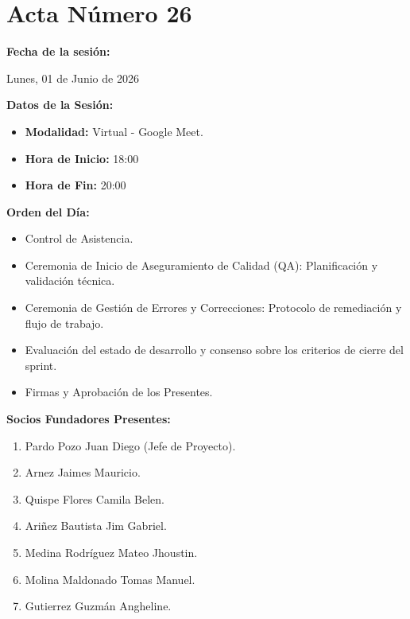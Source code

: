 \newpage
\section{Acta Número 26}
\label{sec:acta26}

\noindent \textbf{Fecha de la sesión:}\par
Lunes, 01 de Junio de 2026

\vspace*{0.5cm}
\noindent \textbf{Datos de la Sesión:}
\vspace{-0.2cm}
\begin{itemize}[noitemsep]
    \item \textbf{Modalidad:} Virtual - Google Meet.
    \item \textbf{Hora de Inicio:} 18:00
    \item \textbf{Hora de Fin:} 20:00
\end{itemize}

\vspace*{0.5cm}
\noindent \textbf{Orden del Día:}
\vspace{-0.2cm}
\begin{itemize}[noitemsep]
    \item Control de Asistencia.
    \item Ceremonia de Inicio de Aseguramiento de Calidad (QA): Planificación y validación técnica.
    \item Ceremonia de Gestión de Errores y Correcciones: Protocolo de remediación y flujo de trabajo.
    \item Evaluación del estado de desarrollo y consenso sobre los criterios de cierre del sprint.
    \item Firmas y Aprobación de los Presentes.
\end{itemize}

\vspace*{0.5cm}
\noindent \textbf{Socios Fundadores Presentes:}
\vspace{-0.2cm}
\begin{enumerate}[noitemsep]
    \item Pardo Pozo Juan Diego (Jefe de Proyecto).
    \item Arnez Jaimes Mauricio.
    \item Quispe Flores Camila Belen.
    \item Ariñez Bautista Jim Gabriel.
    \item Medina Rodríguez Mateo Jhoustin.
    \item Molina Maldonado Tomas Manuel.
    \item Gutierrez Guzmán Angheline.
\end{enumerate}

